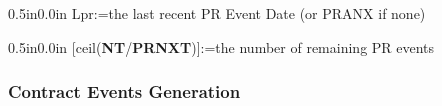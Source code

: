 \documentclass[9pt,oneside]{amsart}
\begin{document}
\setlength{\parskip}{0.0pt}
\begin{adjustwidth}{0.5in}{0.0in}
Lpr:=the last recent PR Event Date (or PRANX if none)\par

\end{adjustwidth}

\begin{adjustwidth}{0.5in}{0.0in}
[ceil(\textbf{NT}/\textbf{PRNXT})]:=the number of remaining PR events

\end{adjustwidth}

\setlength{\parskip}{8.04pt}
\subsubsection{Contract Events Generation}


\end{document}
